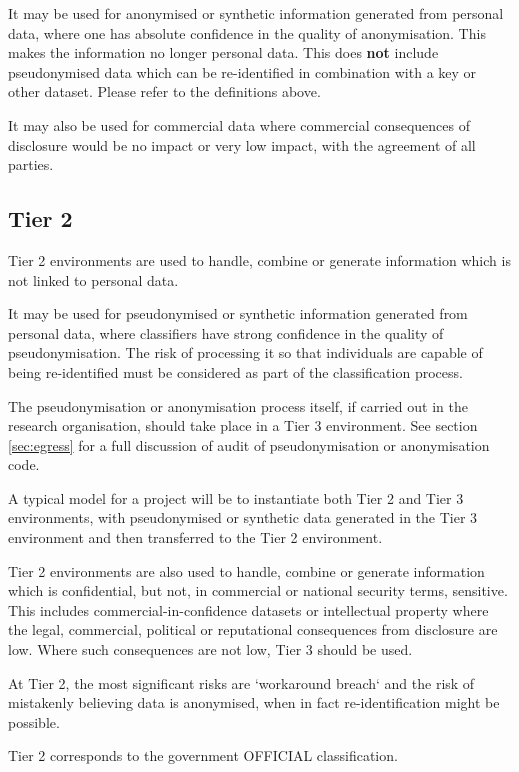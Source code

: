\documentclass[10pt,a4paper,twocolumn]{article}
\begin{document}
It may be used for anonymised or synthetic information generated from personal data, where one has absolute 
confidence in the quality of anonymisation. This makes the information no longer personal data. This does \textbf{not} include pseudonymised data which can be re-identified in combination with a key or other dataset. Please refer to the definitions above.

It may also be used for commercial data where commercial consequences of disclosure would be no impact or very low impact, with the agreement of all parties.

\subsection{Tier 2}

Tier 2 environments are used to handle, combine or generate information which is not linked to personal data.

It may be used for pseudonymised or synthetic information generated from personal data, where classifiers have strong
confidence in the quality of pseudonymisation. 
The risk of processing it so that individuals are capable of being re-identified must be considered as part of the classification process.

The pseudonymisation or anonymisation process itself, if carried out in the research organisation, should take place in a Tier 3 environment.
See section \ref{sec:egress} for a full discussion of audit of pseudonymisation or anonymisation code.


A typical model for a project will be to instantiate both Tier 2 and Tier 3 environments, with pseudonymised or synthetic data generated in 
the Tier 3 environment and then transferred to the Tier 2 environment.


Tier 2 environments are also used to handle, combine or generate information which is confidential, but not, in commercial or national security terms, sensitive.
This includes commercial-in-confidence datasets or intellectual property where the legal, commercial, political or reputational consequences from disclosure are low. Where such consequences are not low, Tier 3 should be used.

At Tier 2, the most significant risks are `workaround breach` and the risk of  mistakenly believing data is anonymised, when in fact re-identification might be possible.

Tier 2 corresponds to the government OFFICIAL classification.
\end{document}
